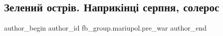  
 
 
 
 

\subsection{Зелений острів. Наприкінці серпня, солерос}
\label{sec:25_02_2023.fb.fb_group.mariupol.pre_war.1.zelenii_ostr_v__napr}

\ifcmt
 author_begin
   author_id fb_group.mariupol.pre_war
 author_end
\fi
